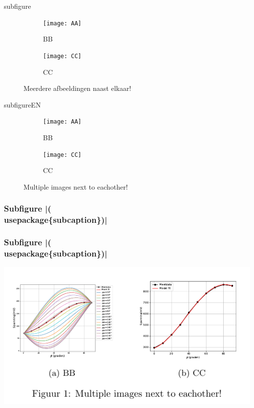 \documentclass[presentatie.tex]{subfiles}
\begin{document}
\begin{saveblock}{subfigure}
	\begin{highlightblock}[linewidth=0.95\textwidth,framexleftmargin=0.25em]
		\begin{figure}[htbp]
			\centering
			\begin{subfigure}[b]{0.45\textwidth}
				\texttt{[image: AA]}
				\caption{BB}
				\label{fig:dphiExample}
			\end{subfigure}\qquad
			\begin{subfigure}[b]{0.45\textwidth}
				\texttt{[image: CC]}
				\caption{CC}
				\label{fig:fitExample}
			\end{subfigure}
			\caption{Meerdere afbeeldingen naast elkaar!}
		\end{figure}
	\end{highlightblock}
\end{saveblock}

\begin{saveblock}{subfigureEN}
	\begin{highlightblock}[linewidth=0.95\textwidth,framexleftmargin=0.25em]
		\begin{figure}[htbp]
			\centering
			\begin{subfigure}[b]{0.45\textwidth}
				\texttt{[image: AA]}
				\caption{BB}
				\label{fig:dphiExample}
			\end{subfigure}\qquad
			\begin{subfigure}[b]{0.45\textwidth}
				\texttt{[image: CC]}
				\caption{CC}
				\label{fig:fitExample}
			\end{subfigure}
			\caption{Multiple images next to eachother!}
		\end{figure}
	\end{highlightblock}
\end{saveblock}


\begin{frame}
	\frametitle{Subfigure \hll|(\\usepackage\{subcaption\})|}

\end{frame}

\begin{frame}
	\frametitle{Subfigure \hll|(\\usepackage\{subcaption\})|}

	\centering
	\includegraphics[width=\textwidth,height=0.8\textheight,keepaspectratio]{assets/4_Abeeldingen/outdir/subfigure}
\end{frame}
\end{document}
